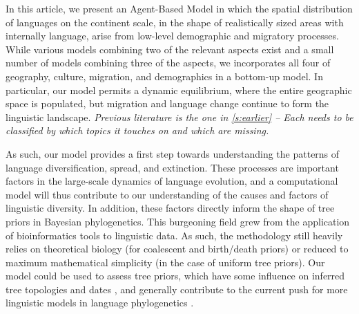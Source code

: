 \documentclass[a4paper,12pt]{scrartcl}
\begin{document}
In this article, we present an Agent-Based Model in which the spatial
distribution of languages on the continent scale, in the shape of realistically
sized areas with internally language, arise from low-level demographic and
migratory processes. 
While various models combining two of the relevant aspects exist and a small
number of models combining three of the aspects, we incorporates all four of
geography, culture, migration, and demographics in a bottom-up model.
In particular, our model permits a dynamic equilibrium, where the entire
geographic space is populated, but migration and language change continue to
form the linguistic landscape.
\emph{Previous literature is the one in \cref{s:earlier} – Each needs to be
  classified by which topics it touches on and which are missing.}

As such, our model provides a first step towards understanding the patterns of
language diversification, spread, and extinction. These processes are important
factors in the large-scale dynamics of language evolution, and a computational
model will thus contribute to our understanding of the causes and factors of
linguistic diversity.
In addition, these factors directly inform the
shape of tree priors in Bayesian phylogenetics. This burgeoning field
\parencite{jager,bouckaert,gray,sino-tibetan} grew from the application of
bioinformatics tools to linguistic data. As such, the methodology still heavily
relies on theoretical biology (for coalescent and birth/death priors) or reduced
to maximum mathematical simplicity (in the case of uniform tree priors). Our
model could be used to assess tree priors, which have some influence on inferred
tree topologies and dates \cite{rama2018three}, and generally contribute to the
current push for more linguistic models in language phylogenetics
\parencite{stochasticdollo,dollowithlateraltransfers,neureiter,maurits-rakes,kaiping-tap,kaiping-burstclock}.
\end{document}
